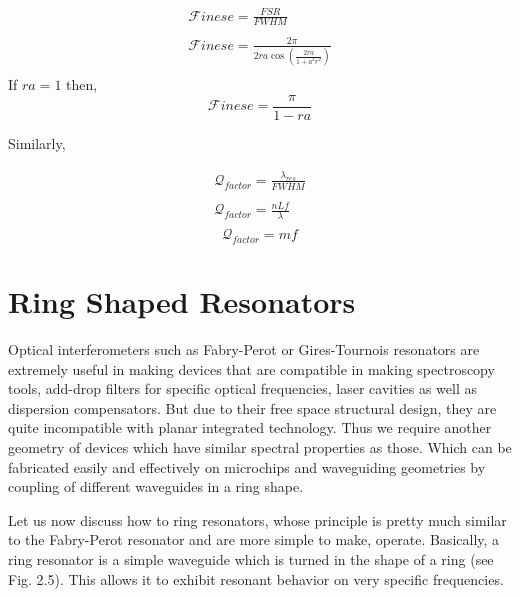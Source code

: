 \begin{align*}
{\mathcal F}inese = \frac{FSR}{FWHM} \\ 
\\
{\mathcal F}inese = \frac{2\pi}{2ra\cos{(\frac{2ra}{1+a^{2}r^{2}})}} \\
\end{align*}
{\normalfont If $ra = 1$ then,} \\
\begin{equation}
{\mathcal F}inese = \frac{\pi}{1-ra}
\end{equation}

Similarly, 

\begin{align*}
{\mathcal Q}_{factor} = \frac{\lambda_{res}}{FWHM} \\ 
\\
{\mathcal Q}_{factor} = \frac{nLf}{\lambda} \\
\end{align*}
\begin{equation}
{\mathcal Q}_{factor} = m f
\end{equation}


\section{Ring Shaped Resonators}
Optical interferometers such as Fabry-Perot or Gires-Tournois resonators are extremely useful in making devices that are compatible in making spectroscopy tools, add-drop filters for specific optical frequencies, laser cavities as well as dispersion compensators. But due to their free space structural design, they are quite incompatible with planar integrated technology. Thus we require another geometry of devices which have similar spectral properties as those. Which can be fabricated easily and effectively on microchips and waveguiding geometries by coupling of different waveguides in a ring shape.

Let us now discuss how to ring resonators, whose principle is pretty much similar to the Fabry-Perot resonator and are more simple to make, operate. Basically, a ring resonator is a simple waveguide which is turned in the shape of a ring (see Fig. 2.5). This allows it to exhibit resonant behavior on very specific frequencies.


